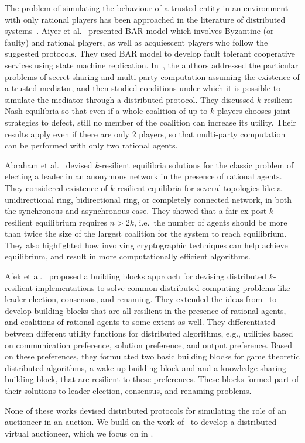 The problem of simulating the behaviour of a trusted entity in an environment 
with only rational players has been approached in the literature of 
distributed systems~\cite{Aiyer2005,Halpern:04,Abraham:06,Abraham2013,Afek2014}.
%
Aiyer et al.~\cite{Aiyer2005} presented BAR model which involves Byzantine (or faulty) 
and rational players, as well as acquiescent players who follow the suggested protocols. 
They used BAR model to develop fault tolerant cooperative services using state machine replication.
%
In~\cite{Halpern:04,Abraham:06}, the authors addressed the
particular problems of secret sharing and multi-party computation
assuming the existence of a trusted mediator, 
and then studied conditions under which it is possible to simulate the mediator through a distributed protocol. 
They discussed $k$-resilient Nash equilibria
so that even if a whole coalition of up to $k$ players 
chooses joint strategies to defect, 
still no member of the coalition can increase its utility.
Their results apply even if there are only 2 players, 
so that multi-party computation can be performed with only two rational agents. 

%
Abraham et al.~\cite{Abraham2013} devised $k$-resilient equilibria solutions 
for the classic problem of electing a leader in an anonymous network in the presence of rational agents. 
They considered existence of $k$-resilient equilibria for several topologies 
like a unidirectional ring, bidirectional ring, or completely connected network, 
in both the synchronous and asynchronous case.
They showed that a fair ex post $k$-resilient equilibrium 
requires $n > 2k$, i.e.~the number of agents should be more than 
twice the size of the largest coalition for the system to reach equilibrium.
They also highlighted how involving cryptographic techniques 
can help achieve equilibrium, and result in more computationally efficient algorithms.

Afek et al.~\cite{Afek2014} proposed a building blocks approach 
for devising distributed $k$-resilient implementations 
to solve common distributed computing problems 
like leader election, consensus, and renaming. 
They extended the ideas from~\cite{Abraham2013} to develop building blocks 
that are all resilient in the presence of rational agents, 
and coalitions of rational agents to some extent as well.
They differentiated between different utility functions for distributed algorithms, 
e.g., utilities based on communication preference, 
solution preference, and output preference. 
Based on these preferences, they formulated two basic building blocks 
for game theoretic distributed algorithms, 
a wake-up building block and and a knowledge sharing building block,
that are resilient to these preferences. 
These blocks formed part of their solutions to 
leader election, consensus, and renaming problems.

None of these works devised distributed protocols for simulating the role of an auctioneer in an auction. 
We build on the work of~\cite{Abraham2013, Afek2014} to develop a distributed virtual auctioneer, 
which we focus on in .
